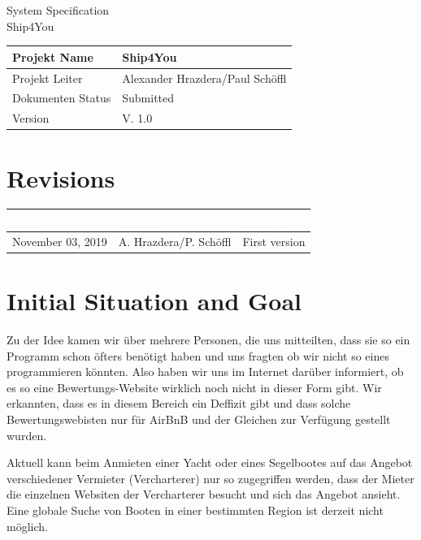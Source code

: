 \documentclass[12pt]{article}
\theoremstyle{definition}
\newcommand{\projectname}{Ship4You}
\newcommand{\productname}{Ship4You}
\newcommand{\projectleader}{Alexander Hrazdera/Paul Schöffl}
\newcommand{\documentstatus}{Submitted}
\newcommand{\version}{V. 1.0}
\begin{document}
\begin{titlepage}

\vspace{10em}

\begin{center}
{\Huge System Specification} \\[3em]
{\LARGE \productname} \\[3em]
\end{center}

\begin{flushleft} 
\begin{tabular}{|l|l|}
\hline
Projekt Name & \projectname \\ \hline
Projekt Leiter & \projectleader \\ \hline
Dokumenten Status & \documentstatus \\ \hline
Version & \version \\ \hline
\end{tabular}
\end{flushleft}

\end{titlepage}
\section*{Revisions}
\begin{tabular}{|l|l|l|}
\hline
\cellcolor[gray]{0.5}\textcolor{white}{Date} & \cellcolor[gray]{0.5}\textcolor{white}{Author} & \cellcolor[gray]{0.5}\textcolor{white}{Change} \\ \hline
November 03, 2019&A. Hrazdera/P. Schöffl&First version \\ \hline
\end{tabular}
\pagebreak
\tableofcontents
\pagebreak

\section{Initial Situation and Goal}
	Zu der Idee kamen wir über mehrere Personen, die uns mitteilten, dass sie so ein Programm schon öfters benötigt haben und uns fragten ob wir nicht so eines programmieren könnten. Also haben wir uns im Internet darüber informiert, ob es so eine Bewertungs-Website wirklich noch nicht in dieser Form gibt.
	Wir erkannten, dass es in diesem Bereich ein Deffizit gibt und dass solche Bewertungswebisten nur für AirBnB und der Gleichen zur Verfügung gestellt wurden.
	
	Aktuell kann beim Anmieten einer Yacht oder eines Segelbootes auf das Angebot verschiedener Vermieter (Vercharterer) nur so zugegriffen werden, dass der Mieter die einzelnen Websiten der Vercharterer besucht und sich das Angebot ansieht. Eine globale Suche von Booten in einer bestimmten Region ist derzeit nicht möglich.
	
\end{document}
